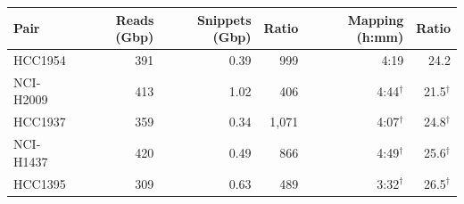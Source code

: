 \begin{tabular}{lrrrrr}
\toprule
Pair & Reads (Gbp) & Snippets (Gbp) & Ratio & Mapping (h:mm) & Ratio \\
\midrule
HCC1954 & 391 & 0.39 & 999 & 4:19 & 24.2 \\
NCI-H2009 & 413 & 1.02 & 406 & 4:44$^\dagger$ & 21.5$^\dagger$ \\
HCC1937 & 359 & 0.34 & 1,071 & 4:07$^\dagger$ & 24.8$^\dagger$ \\
NCI-H1437 & 420 & 0.49 & 866 & 4:49$^\dagger$ & 25.6$^\dagger$ \\
HCC1395 & 309 & 0.63 & 489 & 3:32$^\dagger$ & 26.5$^\dagger$ \\
\bottomrule
\end{tabular}
